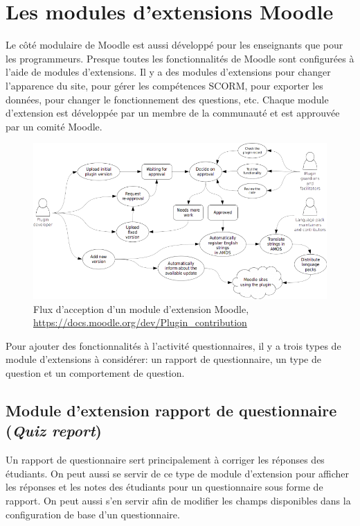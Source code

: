 \chapter{Les modules d'extensions Moodle}

Le côté modulaire de Moodle est aussi développé pour les enseignants que pour les programmeurs.
Presque toutes les fonctionnalités de Moodle sont configurées à l'aide de modules d'extensions.
Il y a des modules d'extensions pour changer l'apparence du site, pour gérer les compétences SCORM, pour exporter les données, pour changer le fonctionnement des questions, etc.
Chaque module d'extension est développée par un membre de la communauté et est approuvée par un comité Moodle.

\begin{figure}[h!]
  \includegraphics[scale=0.7]{images/plugin-contribution-workflow.png}
  \caption[Flux d'acception d'un module d'extension Moodle]{Flux d'acception d'un module d'extension Moodle, \href{https://docs.moodle.org/dev/Plugin_contribution}{\mbox{https://docs.moodle.org/dev/Plugin\_contribution}}}
\end{figure}

Pour ajouter des fonctionnalités à l'activité questionnaires, il y a trois types de module d'extensions à considérer: un rapport de questionnaire, un type de question et un comportement de question.

\section{Module d'extension rapport de questionnaire (\textit{Quiz report})}

Un rapport de questionnaire sert principalement à corriger les réponses des étudiants.
On peut aussi se servir de ce type de module d'extension pour afficher les réponses et les notes des étudiants pour un questionnaire sous forme de rapport.
On peut aussi s'en servir afin de modifier les champs disponibles dans la configuration de base d'un questionnaire.

